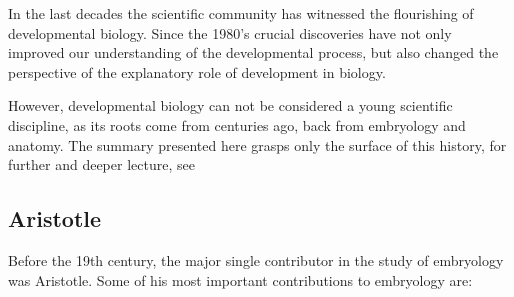 %
%

In the last decades the scientific community has witnessed the flourishing of developmental biology.
Since the 1980's crucial discoveries \citep{Gilbert1998} have not only improved our understanding of the developmental process, but also changed the perspective of the explanatory role of development in biology.

However, developmental biology can not be considered a young scientific discipline, as its roots come from centuries ago, back from embryology and anatomy.
The summary presented here grasps only the surface of this history, for further and deeper lecture, see \citep{gilbert1991conceptual,amundson2005changing,hall1999evolutionary} %


\subsection{Aristotle}
Before the 19th century, the major single contributor in the study of embryology was Aristotle. 
Some of his most important contributions to embryology are:

